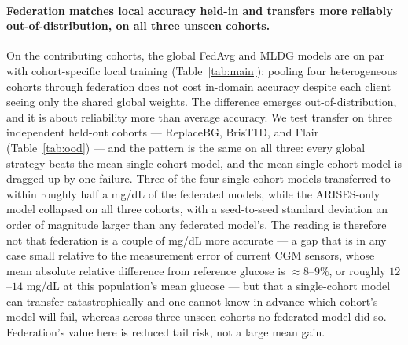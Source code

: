 \documentclass[10pt,letterpaper]{article}
\begin{document}
\paragraph{Federation matches local accuracy held-in and transfers more reliably
out-of-distribution, on all three unseen cohorts.} On the contributing cohorts,
the global FedAvg and MLDG models are on par with cohort-specific local training
(Table~\ref{tab:main}): pooling four
heterogeneous cohorts through federation does not cost in-domain accuracy despite
each client seeing only the shared global weights. The difference emerges
out-of-distribution, and it is about reliability more than average accuracy. We
test transfer on three independent held-out cohorts --- ReplaceBG, BrisT1D, and
Flair (Table~\ref{tab:ood}) --- and the pattern is the same on all three: every
global strategy beats the mean single-cohort model, and the mean single-cohort
model is dragged up by one failure. Three of the four single-cohort models
transferred to within roughly half a mg/dL of the federated models, while the
ARISES-only model collapsed on all three cohorts, with a seed-to-seed standard
deviation an order of magnitude larger than any federated model's. The
reading is therefore not that federation is a couple of mg/dL more accurate ---
a gap that is in any case small relative to the measurement error of current CGM
sensors, whose mean absolute relative difference from reference glucose is
$\approx 8$--$9\%$, or roughly $12$--$14$ mg/dL at this population's mean
glucose \cite{garg2022dexcomg7,alva2023libre3} --- but that a single-cohort
model can transfer
catastrophically and one cannot know in advance which cohort's model will fail,
whereas across three unseen cohorts no federated model did so. Federation's value
here is reduced tail risk, not a large mean gain.
\end{document}
